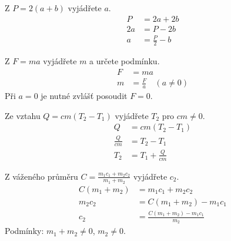 \documentclass[11pt,a4paper]{article}
\begin{document}
\begin{zadaniReseniBox}[title={Samostatná práce 1}]
Z $P=2(a+b)$ vyjádřete $a$.
\tcblower
\[\begin{aligned}
P&=2a+2b \\
2a&=P-2b \\
a&=\frac P2-b
\end{aligned}\]

\end{zadaniReseniBox}
\begin{zadaniReseniBox}[title={Samostatná práce 2}]
Z $F=ma$ vyjádřete $m$ a určete podmínku.
\tcblower
\[\begin{aligned}
F&=ma \\
m&=\frac Fa\quad(a\ne0)
\end{aligned}\]
Při $a=0$ je nutné zvlášť posoudit $F=0$.
\end{zadaniReseniBox}
\begin{zadaniReseniBox}[title={Samostatná práce 3}]
Ze vztahu $Q=cm(T_2-T_1)$ vyjádřete $T_2$ pro $cm\ne0$.
\tcblower
\[\begin{aligned}
Q&=cm(T_2-T_1) \\
\frac Q{cm}&=T_2-T_1 \\
T_2&=T_1+\frac Q{cm}
\end{aligned}\]

\end{zadaniReseniBox}
\begin{zadaniReseniBox}[title={Rozšíření 1}]
Z váženého průměru $C=\frac{m_1c_1+m_2c_2}{m_1+m_2}$ vyjádřete $c_2$.
\tcblower
\[\begin{aligned}
C(m_1+m_2)&=m_1c_1+m_2c_2 \\
m_2c_2&=C(m_1+m_2)-m_1c_1 \\
c_2&=\frac{C(m_1+m_2)-m_1c_1}{m_2}
\end{aligned}\]
Podmínky: $m_1+m_2\ne0$, $m_2\ne0$.
\end{zadaniReseniBox}
\begingroup\setlength{\abovedisplayskip}{2pt}\setlength{\belowdisplayskip}{2pt}\setlength{\jot}{1pt}
\end{document}
